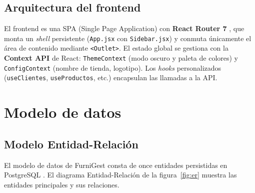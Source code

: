 \documentclass[12pt,twoside,titlepage]{report}
\begin{document}
\subsection{Arquitectura del frontend}

El frontend es una SPA (Single Page Application) con \textbf{React Router 7} \cite{reactrouter}, que monta un \emph{shell} persistente (\texttt{App.jsx} con \texttt{Sidebar.jsx}) y conmuta únicamente el área de contenido mediante \texttt{<Outlet>}. El estado global se gestiona con la \textbf{Context API} de React: \texttt{ThemeContext} (modo oscuro y paleta de colores) y \texttt{ConfigContext} (nombre de tienda, logotipo). Los \emph{hooks} personalizados (\texttt{useClientes}, \texttt{useProductos}, etc.) encapsulan las llamadas a la API.


\section{Modelo de datos}

\subsection{Modelo Entidad-Relación}

El modelo de datos de FurniGest consta de once entidades persistidas en PostgreSQL \cite{postgresql}. El diagrama Entidad-Relación \cite{chen1976} de la figura~\ref{fig:er} muestra las entidades principales y sus relaciones.
\end{document}
